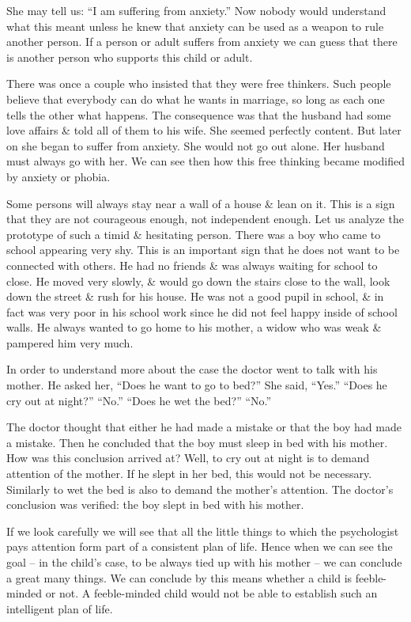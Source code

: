 \documentclass{article}
\numberwithin{equation}{section}
\begin{document}
She may tell us: ``I am suffering from anxiety.'' Now nobody would understand what this meant unless he knew that anxiety can be used as a weapon to rule another person. If a person or adult suffers from anxiety we can guess that there is another person who supports this child or adult.

There was once a couple who insisted that they were free thinkers. Such people believe that everybody can do what he wants in marriage, so long as each one tells the other what happens. The consequence was that the husband had some love affairs \& told all of them to his wife. She seemed perfectly content. But later on she began to suffer from anxiety. She would not go out alone. Her husband must always go with her. We can see then how this free thinking became modified by anxiety or phobia.

Some persons will always stay near a wall of a house \& lean on it. This is a sign that they are not courageous enough, not independent enough. Let us analyze the prototype of such a timid \& hesitating person. There was a boy who came to school appearing very shy. This is an important sign that he does not want to be connected with others. He had no friends \& was always waiting for school to close. He moved very slowly, \& would go down the stairs close to the wall, look down the street \& rush for his house. He was not a good pupil in school, \& in fact was very poor in his school work since he did not feel happy inside of school walls. He always wanted to go home to his mother, a widow who was weak \& pampered him very much.

In order to understand more about the case the doctor went to talk with his mother. He asked her, ``Does he want to go to bed?'' She said, ``Yes.'' ``Does he cry out at night?'' ``No.'' ``Does he wet the bed?'' ``No.''

The doctor thought that either he had made a mistake or that the boy had made a mistake. Then he concluded that the boy must sleep in bed with his mother. How was this conclusion arrived at? Well, to cry out at night is to demand attention of the mother. If he slept in her bed, this would not be necessary. Similarly to wet the bed is also to demand the mother's attention. The doctor's conclusion was verified: the boy slept in bed with his mother.

If we look carefully we will see that all the little things to which the psychologist pays attention form part of a consistent plan of life. Hence when we can see the goal -- in the child's case, to be always tied up with his mother -- we can conclude a great many things. We can conclude by this means whether a child is feeble-minded or not. A feeble-minded child would not be able to establish such an intelligent plan of life.
\end{document}
